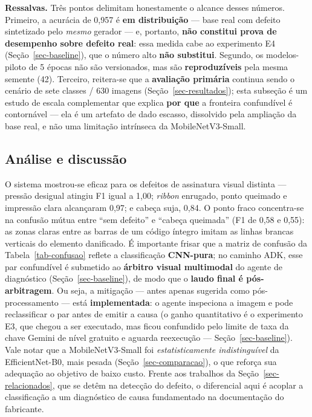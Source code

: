 \documentclass[
	article,			%
	11pt,				%
	oneside,			%
	a4paper,			%
	english,			%
	brazilian,			%
	sumario=tradicional
	]{abntex2}
\begin{document}
\noindent\textbf{Ressalvas.} Três pontos delimitam honestamente o alcance desses
números. Primeiro, a acurácia de 0,957 é \textbf{em distribuição} --- base real com
defeito sintetizado pelo \emph{mesmo} gerador --- e, portanto, \textbf{não constitui
prova de desempenho sobre defeito real}: essa medida cabe ao experimento E4
(Seção~\ref{sec-baseline}), que o número alto \textbf{não substitui}. Segundo, os
modelos-piloto de 5 épocas não são versionados, mas são \textbf{reproduzíveis} pela
mesma semente (42). Terceiro, reitera-se que a \textbf{avaliação primária} continua
sendo o cenário de sete classes / 630 imagens (Seção~\ref{sec-resultados}); esta
subseção é um estudo de escala complementar que explica \textbf{por que} a fronteira
confundível é contornável --- ela é um artefato de dado escasso, dissolvido pela
ampliação da base real, e não uma limitação intrínseca da MobileNetV3-Small.

\subsection{Análise e discussão}

O sistema mostrou-se eficaz para os defeitos de assinatura visual distinta ---
pressão desigual atingiu F1 igual a 1,00; \textit{ribbon} enrugado, ponto queimado e
impressão clara alcançaram 0,97; e cabeça suja, 0,84. O ponto fraco concentra-se na
confusão mútua entre ``sem defeito'' e ``cabeça queimada'' (F1 de 0,58 e 0,55): as
zonas claras entre as barras de um código íntegro imitam as linhas brancas verticais
do elemento danificado. É importante frisar que a matriz de confusão da
Tabela~\ref{tab-confusao} reflete a classificação \textbf{CNN-pura}; no caminho ADK,
esse par confundível é submetido ao \textbf{árbitro visual multimodal} do agente de
diagnóstico (Seção~\ref{sec-baseline}), de modo que o \textbf{laudo final é
pós-arbitragem}. Ou seja, a mitigação --- antes apenas sugerida como pós-processamento
--- está \textbf{implementada}: o agente inspeciona a imagem e pode reclassificar o par
antes de emitir a causa (o ganho quantitativo é o experimento E3, que chegou a ser
executado, mas ficou confundido pelo limite de taxa da chave Gemini de nível gratuito e
aguarda reexecução --- Seção~\ref{sec-baseline}). Vale notar que a
MobileNetV3-Small foi \emph{estatisticamente indistinguível} da EfficientNet-B0, mais
pesada (Seção~\ref{sec-comparacao}), o que reforça sua adequação ao objetivo de baixo
custo. Frente aos trabalhos da Seção~\ref{sec-relacionados}, que se detêm na detecção
do defeito, o diferencial aqui é acoplar a classificação a um diagnóstico de causa
fundamentado na documentação do fabricante.
\end{document}
